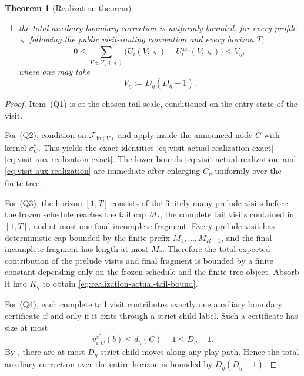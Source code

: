 \documentclass[12pt]{article}
\newtheorem{theorem}{Theorem}[section]
\theoremstyle{definition}
\newcommand{\E}{\mathbb{E}}
\newcommand{\1}{\mathbf{1}}
\newcommand{\cF}{\mathcal{F}}
\begin{document}
\begin{theorem}[Realization theorem]
\begin{enumerate}[label=\textnormal{(Q\arabic*)},leftmargin=2.8em]
\begin{equation}
\label{eq:realization-actual-tail-bound}
\left|
\gamma_i^T(s,\varsigma)
-
\frac1T\E\left[
\sum_{V\in\mathcal V_T(\varsigma)}
U_i^{\mathrm{act}}(V;\varsigma)
\right]
\right|
\le \frac{K_\eta}{T},
\end{equation}
where $\mathcal V_T(\varsigma)$ denotes the complete tail visits contained in
$[1,T]$. The constant $K_\eta$ absorbs the finite prelude visits and the final
incomplete fragment cut by the horizon;
\item the total auxiliary boundary correction is uniformly bounded:
for every profile $\varsigma$ following the public visit-routing convention and
every horizon $T$,
\begin{equation}
\label{eq:aux-actual-discrepancy}
0
\le
\sum_{V\in\mathcal V_T(\varsigma)}
\bigl(
\widetilde U_i(V;\varsigma)-U_i^{\mathrm{act}}(V;\varsigma)
\bigr)
\le
V_\eta,
\end{equation}
where one may take
\[
V_\eta:=D_\eta(D_\eta-1).
\]
\end{enumerate}
\end{theorem}

\begin{proof}
Item~(Q1) is  at the chosen tail scale, conditioned on
the entry state of the visit.

For (Q2), condition on $\cF_{\mathrm{in}(V)}$ and apply
 inside the announced node $C$ with kernel
$\sigma_C^*$. This yields the exact identities
\eqref{eq:visit-actual-realization-exact}--\eqref{eq:visit-aux-realization-exact}.
The lower bounds \eqref{eq:visit-actual-realization} and
\eqref{eq:visit-aux-realization} are immediate after enlarging $C_\eta$
uniformly over the finite tree.

For (Q3), the horizon $[1,T]$ consists of the finitely many prelude visits before
the frozen schedule reaches the tail cap $M_*$, the complete tail visits
contained in $[1,T]$, and at most one final incomplete fragment. Every prelude
visit has deterministic cap bounded by the finite prefix
$M_1,\dots,M_{R-1}$, and the final incomplete fragment has length at most $M_*$.
Therefore the total expected contribution of the prelude visits and final
fragment is bounded by a finite constant depending only on the frozen schedule
and the finite tree object. Absorb it into $K_\eta$ to obtain
\eqref{eq:realization-actual-tail-bound}.

For (Q4), each complete tail visit contributes exactly one auxiliary boundary
certificate if and only if it exits through a strict child label. Such a
certificate has size at most
\[
v_{i,C}^{x^*}(b)\le d_\eta(C)-1\le D_\eta-1.
\]
By , there are at most $D_\eta$ strict child moves
along any play path. Hence the total auxiliary correction over the entire horizon
is bounded by $D_\eta(D_\eta-1)$.
\end{proof}
\end{document}
